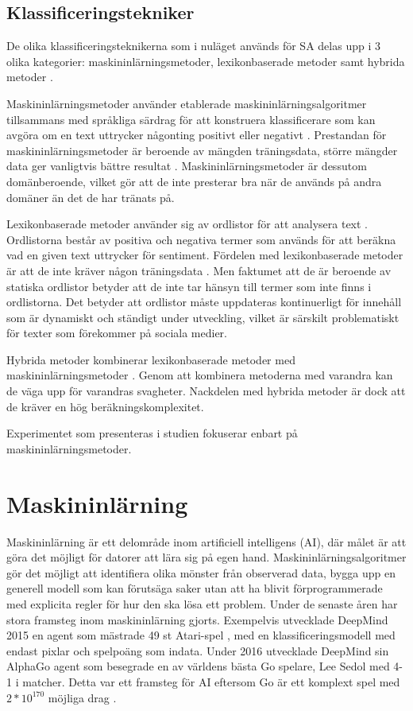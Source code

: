 \documentclass{kaumasters} %
\begin{document}
\subsection{Klassificeringstekniker} \label{SAkt}
De olika klassificeringsteknikerna som i nuläget används för SA delas upp i 3 olika kategorier: maskininlärningsmetoder, lexikonbaserade metoder samt hybrida metoder \cite{SAsurvey}. 

Maskininlärningsmetoder använder etablerade maskininlärningsalgoritmer tillsammans med språkliga särdrag för att konstruera klassificerare som kan avgöra om en text uttrycker någonting positivt eller negativt \cite{SAsurvey}. Prestandan för maskininlärningsmetoder är beroende av mängden träningsdata, större mängder data ger vanligtvis bättre resultat \cite{TSAsurvey}. Maskininlärningsmetoder är dessutom domänberoende, vilket gör att de inte presterar bra när de används på andra domäner än det de har tränats på. 

Lexikonbaserade metoder använder sig av ordlistor för att analysera text \cite{SAsurvey}. Ordlistorna består av positiva och negativa termer som används för att beräkna vad en given text uttrycker för sentiment.
Fördelen med lexikonbaserade metoder är att de inte kräver någon  träningsdata \cite{TSAsurvey}. Men faktumet att de är beroende av statiska ordlistor betyder att de inte tar hänsyn till termer som inte finns i ordlistorna. Det betyder att ordlistor måste uppdateras kontinuerligt för innehåll som är dynamiskt och ständigt under utveckling, vilket är särskilt problematiskt för texter som förekommer på sociala medier. 

Hybrida metoder kombinerar lexikonbaserade metoder med maskininlärningsmetoder \cite{TSAsurvey}. Genom att kombinera metoderna med varandra kan de väga upp för varandras svagheter. Nackdelen med hybrida metoder är dock att de kräver en hög beräkningskomplexitet.

Experimentet som presenteras i studien fokuserar enbart på maskininlärningsmetoder.

\section{Maskininlärning} \label{ML}
Maskininlärning är ett delområde inom artificiell intelligens (AI), där målet är att göra det möjligt för datorer att lära sig på egen hand. Maskininlärningsalgoritmer gör det möjligt att identifiera olika mönster från observerad data, bygga upp en generell modell som kan förutsäga saker utan att ha blivit förprogrammerade med explicita regler för hur den ska lösa ett problem. Under de senaste åren har stora framsteg inom maskininlärning gjorts. Exempelvis utvecklade DeepMind \cite{DMatari00} 2015 en agent som mästrade 49 st Atari-spel \cite{wiki:004}, med en klassificeringsmodell med endast pixlar och spelpoäng som indata. Under 2016 utvecklade DeepMind sin AlphaGo \cite{DMgo} agent som besegrade en av världens bästa Go spelare, Lee Sedol \cite{wiki:005} med 4-1 i matcher. Detta var ett framsteg för AI eftersom Go är ett komplext spel med $2 * 10^{170}$ möjliga drag \cite{wiki:006}.
\end{document}

